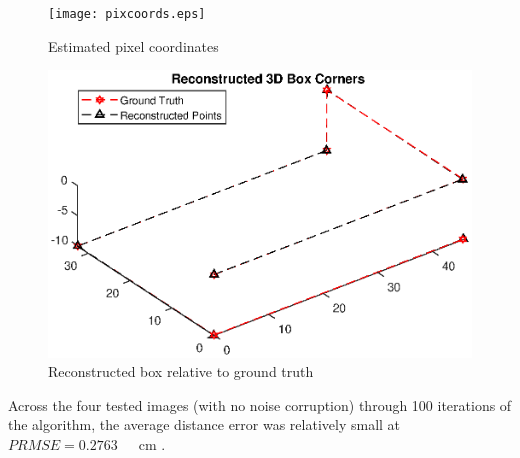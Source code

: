 \documentclass[12pt]{article}
\begin{document}
\begin{figure}[h]
	\centering %
	\captionsetup{justification=centering}
	\begin{minipage}{0.5\textwidth}
			\centering %
		\texttt{[image: pixcoords.eps]}
		\caption{Estimated pixel coordinates} \label{pixcoords} 
	\end{minipage}\hfill
	\begin{minipage}{0.5\textwidth}
		\centering %
		\includegraphics[width=1\textwidth]{pure_recon.eps}
		\caption{Reconstructed box relative to ground truth} \label{pure_recon}
	\end{minipage}
\end{figure}




\noindent Across the four tested images (with no noise corruption) through 100 iterations of the algorithm, the average distance error was relatively small at $PRMSE = 0.2763 \quad$\ cm . 
\end{document}
